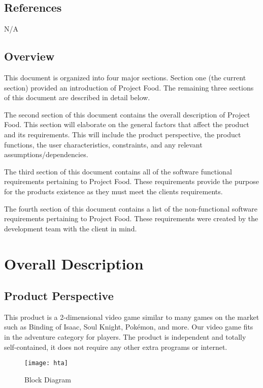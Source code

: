 \documentclass[12pt, titlepage]{article}
\begin{document}
  \subsection{References}
  N/A
  \subsection{Overview}

  This document is organized into four major sections. Section one (the current section) provided an introduction of Project Food. The remaining three sections of this document are described in detail below. 

  The second section of this document contains the overall description of Project Food. This section will elaborate on the general factors that affect the product and its requirements. This will include the product perspective, the product functions, the user characteristics, constraints, and any relevant assumptions/dependencies.

  The third section of this document contains all of the software functional requirements pertaining to Project Food. These requirements provide the purpose for the products existence as they must meet the clients requirements.

  The fourth section of this document contains a list of the non-functional software requirements pertaining to Project Food. These requirements were created by the development team with the client in mind.


\section{Overall Description}

  \subsection{Product Perspective}
  This product is a 2-dimensional video game similar to many games on the market such as Binding of Isaac, Soul Knight, Pokémon, and more. Our video game fits in the adventure category for players. The product is independent and totally self-contained, it does not require any other extra programs or internet.
  
   \begin{figure}[htp]
	\centering
	\texttt{[image: hta]}
	\caption{Block Diagram}
	\label{fig:block}
   \end{figure}
\end{document}

